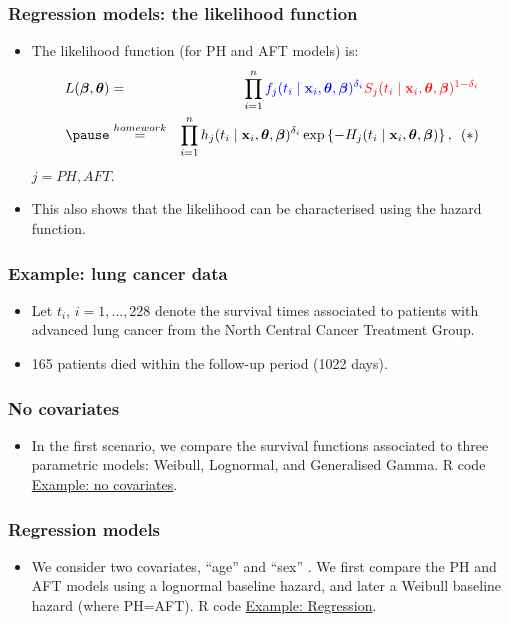 \documentclass[10pt,handout,compress]{beamer}
\newcommand{\bbeta}{\bm{\beta}}
\newcommand{\btheta}{\bm{\theta}}
\newcommand{\bx}{{\bf x}}
\begin{document}
\begin{frame}
\frametitle{Regression models: the likelihood function}
\pause
\begin{itemize}
\item The likelihood function (for PH and AFT models) is:
\begin{eqnarray*}
L(\bbeta,\btheta) &=& \prod_{i=1}^n \textcolor{blue}{f_{j}(t_i \mid {\bx}_i, \btheta,\bbeta)^{\delta_i}} \textcolor{red}{S_{j}(t_i \mid {\bx}_i, \btheta,\bbeta)^{1-\delta_i}}\\
\pause  &\stackrel{\tiny homework}{=}& \prod_{i=1}^n h_{j}(t_i \mid {\bx}_i, \btheta,\bbeta)^{\delta_i} \exp\left\{ - H_{j}(t_i \mid {\bx}_i, \btheta,\bbeta) \right\},\,\,\, (*)
\end{eqnarray*} 
$j=PH,AFT$.

\item This also shows that the likelihood can be characterised using the hazard function.
\end{itemize}
\end{frame}

\begin{frame}
\frametitle{Example: lung cancer data}
\begin{itemize}
\item Let $t_i$, $i=1,\dots,228$ denote the survival times associated to patients with advanced lung cancer from the North Central Cancer Treatment Group.
\item 165 patients died within the follow-up period (1022 days).

\end{itemize}
\end{frame}


\begin{frame}
\frametitle{No covariates}
\begin{itemize}
\item In the first scenario, we compare the survival functions associated to three parametric models: Weibull, Lognormal, and Generalised Gamma. \pause R code \href{https://rpubs.com/FJRubio/PSM}{Example: no covariates}.

\end{itemize}
\end{frame}

\begin{frame}
\frametitle{Regression models}
\begin{itemize}
\item We consider two covariates, ``age'' and  ``sex'' . We first compare the PH and AFT models using a lognormal baseline hazard, and later a Weibull baseline hazard (where PH=AFT). \pause R code \href{https://rpubs.com/FJRubio/PSRM}{Example: Regression}.
\end{itemize}
\end{frame}
\end{document}
